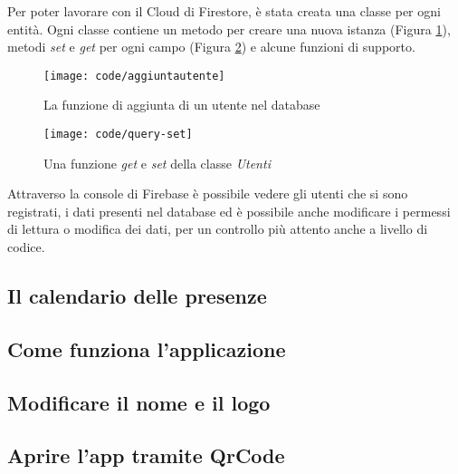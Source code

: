 Per poter lavorare con il Cloud di Firestore, è stata creata una classe per ogni entità.\newline
Ogni classe contiene un metodo per creare una nuova istanza (Figura \ref{fig:code-aggiungi}), metodi \emph{set} e \emph{get} per ogni campo (Figura \ref{fig:code-query}) e alcune funzioni di supporto.
\begin{figure}[!h] 
    \centering 
    \texttt{[image: code/aggiuntautente]} 
    \caption{La funzione di aggiunta di un utente nel database}
    \label{fig:code-aggiungi}
\end{figure}
\begin{figure}[!h] 
    \centering 
    \texttt{[image: code/query-set]} 
    \caption{Una funzione \emph{get} e \emph{set} della classe \emph{Utenti}}
    \label{fig:code-query}
\end{figure}

Attraverso la console di Firebase è possibile vedere gli utenti che si sono registrati, i dati presenti nel database ed è possibile anche modificare i permessi di lettura o modifica dei dati, per un controllo più attento anche a livello di codice. 

\newpage

\subsection{Il calendario delle presenze}

\subsection{Come funziona l'applicazione}

\subsection{Modificare il nome e il logo}

\subsection{Aprire l'app tramite QrCode}